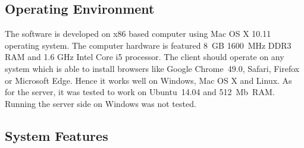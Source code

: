 \subsection{Operating Environment}

The software is developed on x86 based computer using Mac OS X 10.11 operating system. The
computer hardware is featured 8~GB 1600~MHz DDR3 RAM and 1.6 GHz Intel Core i5 processor.
The client should operate on any system which is able to install browsers like Google Chrome~49.0,
Safari, Firefox or Microsoft Edge. Hence it works well on Windows, Mac OS X and Linux. As for the
server, it was tested to work on Ubuntu~14.04 and 512~Mb~RAM. Running the server side on Windows
was not tested.

\subsection{System Features}

